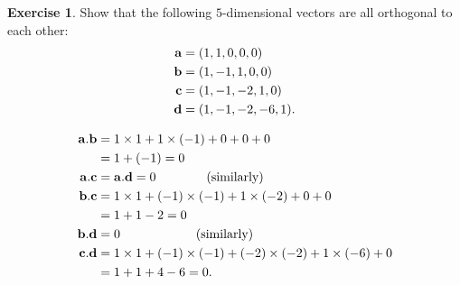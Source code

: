 \documentclass[a4paper]{book}
\theoremstyle{definition}
\newtheorem{exercise}[theorem]{Exercise}
\renewenvironment{solution}{\SolutionInline}{\endSolutionInline}
\begin{document}
\begin{exercise}
 Show that the following $5$-dimensional vectors are all orthogonal to
 each other:
 \begin{align*}
  \mathbf{a} &= (1,1,0,0,0) \\
  \mathbf{b} &= (1,-1,1,0,0) \\
  \mathbf{c} &= (1,-1,-2,1,0) \\
  \mathbf{d} &= (1,-1,-2,-6,1).
 \end{align*}
\end{exercise}
\begin{solution}
 \begin{align*}
  \mathbf{a}.\mathbf{b} &= 1\times 1 + 1 \times (-1) + 0 + 0 + 0 \\
                  &= 1 + (-1) = 0 \\
  \mathbf{a}.\mathbf{c} &= \mathbf{a}.\mathbf{d} = 0 
                     \hspace{4em} \text{(similarly)} \\
  \mathbf{b}.\mathbf{c} &= 1\times 1 + (-1)\times(-1) + 1 \times (-2) + 0 + 0 \\
                  &= 1 + 1 - 2 = 0 \\
  \mathbf{b}.\mathbf{d} &= 0 \hspace{6em} \text{(similarly)} \\
  \mathbf{c}.\mathbf{d} &= 1\times 1 + (-1)\times(-1) + (-2) \times (-2) + 1\times(-6) + 0 \\
                  &= 1 + 1 + 4 - 6 = 0.
 \end{align*}
\end{solution}
\end{document}
